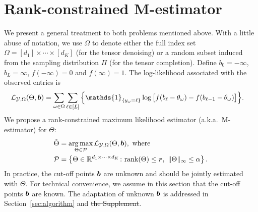 \documentclass[11pt]{article}
\theoremstyle{plain}
\theoremstyle{definition}
\providecommand{\DIFaddtex}[1]{{\protect\color{blue}\uwave{#1}}} %
\providecommand{\DIFdeltex}[1]{{\protect\color{red}\sout{#1}}}                      %
\providecommand{\DIFaddbegin}{} %
\providecommand{\DIFaddend}{} %
\providecommand{\DIFdelbegin}{} %
\providecommand{\DIFdelend}{} %
\providecommand{\DIFadd}[1]{\texorpdfstring{\DIFaddtex{#1}}{#1}} %
\providecommand{\DIFdel}[1]{\texorpdfstring{\DIFdeltex{#1}}{}} %
\begin{document}
\section{Rank-constrained M-estimator}\label{sec:theory}
We present a general treatment to both problems mentioned above. With a little abuse of notation, we use $\Omega$ to denote either the full index set $\Omega=[d_1]\times \cdots \times [d_K]$ (for the tensor denoising) or a random subset induced from the sampling distribution $\Pi$ (for the tensor completion). Define $b_0=-\infty$, $b_L=\infty$, $f(-\infty)=0$ and $f(\infty)=1$. The log-likelihood associated with the observed entries is
\begin{align}\label{eq:objective}
\logl(\Theta, \mb)&=\sum_{\omega\in\Omega}\sum_{\ell\in[L]} \Big\{\mathds{1}_{\{y_\omega=\ell\}} \log \big[f(b_\ell-\theta_\omega)-  \DIFdelbegin %
\DIFdelend f(b_{\ell-1}-\theta_\omega)\big]\Big\}.
\end{align}
We propose a rank-constrained maximum likelihood estimator (a.k.a.\ M-estimator) for $\Theta$:
\begin{align}\label{eq:estimator}
\hat \Theta&=\operatorname*{arg\,max}_{\Theta\in \mathcal{P}}\mathcal{L}_{\mathcal{Y},\Omega}(\Theta, \bm{b}),\ \text{where}\notag \\
\mathcal{P}&=\left\{\Theta\in\mathbb{R}^{d_1\times \cdots \times d_K} \colon \text{rank}(\Theta)\leq \bm{r},\ \lVert\Theta\rVert_\infty\leq \alpha\right\}.
 \end{align}
In practice, the cut-off points $\bm{b}$ are unknown and should be jointly estimated with $\Theta$. For technical convenience, we assume in this section that the cut-off points $\bm{b}$ are known. The adaptation of unknown $\bm{b}$ is addressed in Section~\ref{sec:algorithm} and \DIFdelbegin \DIFdel{the Supplement}\DIFdelend \DIFaddbegin \DIFadd{Appendix~\ref{sec:extention}}\DIFaddend .
\end{document}

